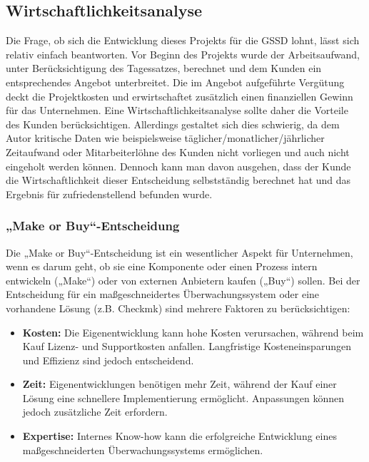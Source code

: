 \begin{flushleft}
	\subsection{Wirtschaftlichkeitsanalyse}
	Die Frage, ob sich die Entwicklung dieses Projekts für die \acs{GSSD} lohnt, lässt sich relativ einfach beantworten. Vor Beginn des Projekts wurde der Arbeitsaufwand, unter Berücksichtigung des Tagessatzes, berechnet und dem Kunden ein entsprechendes Angebot unterbreitet. Die im Angebot aufgeführte Vergütung deckt die Projektkosten und erwirtschaftet zusätzlich einen finanziellen Gewinn für das Unternehmen. Eine Wirtschaftlichkeitsanalyse sollte daher die Vorteile des Kunden berücksichtigen. Allerdings gestaltet sich dies schwierig, da dem Autor kritische Daten wie beispielsweise täglicher/monatlicher/jährlicher Zeitaufwand oder Mitarbeiterlöhne des Kunden nicht vorliegen und auch nicht eingeholt werden können. Dennoch kann man davon ausgehen, dass der Kunde die Wirtschaftlichkeit dieser Entscheidung selbstständig berechnet hat und das Ergebnis für zufriedenstellend befunden wurde.

	\subsubsection{„Make or Buy“-Entscheidung}

	Die „Make or Buy“-Entscheidung ist ein wesentlicher Aspekt für Unternehmen, wenn es darum geht, ob sie eine Komponente oder einen Prozess intern entwickeln („Make“) oder von externen Anbietern kaufen („Buy“) sollen. Bei der Entscheidung für ein maßgeschneidertes Überwachungssystem oder eine vorhandene Lösung (\acs{z.B.} Checkmk) sind mehrere Faktoren zu berücksichtigen:

	\begin{itemize} \item \textbf{Kosten:} Die Eigenentwicklung kann hohe Kosten verursachen, während beim Kauf Lizenz- und Supportkosten anfallen. Langfristige Kosteneinsparungen und Effizienz sind jedoch entscheidend.

	\item \textbf{Zeit:} Eigenentwicklungen benötigen mehr Zeit, während der Kauf einer Lösung eine schnellere Implementierung ermöglicht. Anpassungen können jedoch zusätzliche Zeit erfordern.

	\item \textbf{Expertise:} Internes Know-how kann die erfolgreiche Entwicklung eines maßgeschneiderten Überwachungssystems ermöglichen.


\end{itemize}
\end{flushleft}
